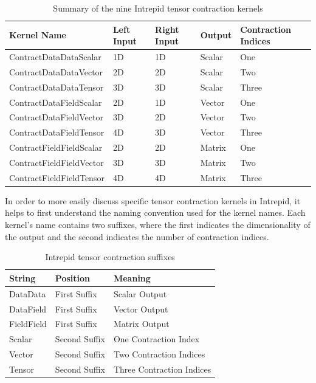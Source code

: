 \begin{table}[ht]
        \begin{tabular} {| l | l | l | l |l |}
            \hline
            \textbf{Kernel Name} & \textbf{Left Input} & \textbf{Right Input} &
            \textbf{Output} & \textbf{Contraction Indices}\\
            \hline
            ContractDataDataScalar   & 1D & 1D & Scalar & One \\
            ContractDataDataVector   & 2D & 2D & Scalar & Two \\
            ContractDataDataTensor   & 3D & 3D & Scalar & Three \\
            ContractDataFieldScalar  & 2D & 1D & Vector & One \\
            ContractDataFieldVector  & 3D & 2D & Vector & Two \\
            ContractDataFieldTensor  & 4D & 3D & Vector & Three \\
            ContractFieldFieldScalar & 2D & 2D & Matrix & One \\
            ContractFieldFieldVector & 3D & 3D & Matrix & Two \\
            ContractFieldFieldTensor & 4D & 4D & Matrix & Three \\
            \hline
        \end{tabular}
\caption{Summary of the nine Intrepid tensor contraction kernels
\label{tab:IntrepidContractionSummary}}
\end{table}

In order to more easily discuss specific tensor contraction kernels in Intrepid,
it helps to first understand the naming convention used for the kernel names.
Each kernel's name contains two suffixes, where the first indicates the
dimensionality of the output and the second indicates the number of contraction
indices.

\begin{table}[ht]
    \begin{center}
        \begin{tabular} {| l | l | l |}
            \hline
            \textbf{String} & \textbf{Position} & \textbf{Meaning} \\
            \hline
            DataData    & First Suffix  & Scalar Output    \\
            DataField   & First Suffix  & Vector Output    \\
            FieldField  & First Suffix  & Matrix Output    \\
            Scalar      & Second Suffix & One Contraction Index \\
            Vector      & Second Suffix & Two Contraction Indices \\
            Tensor      & Second Suffix & Three Contraction Indices \\
            \hline
        \end{tabular}
    \end{center}
\caption{Intrepid tensor contraction suffixes
\label{tab:IntrepidNamingConvention}}
\end{table}

